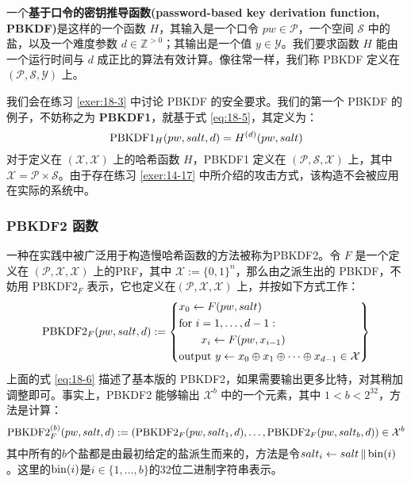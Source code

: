 \begin{definition}
	一个\textbf{基于口令的密钥推导函数(password-based key derivation function, PBKDF)}是这样的一个函数 $H$，其输入是一个口令 $pw\in\mathcal{P}$，一个空间 $\mathcal{S}$ 中的盐，以及一个难度参数 $d\in\mathbb{Z}^{>0}$；其输出是一个值 $y\in\mathcal{Y}$。我们要求函数 $H$ 能由一个运行时间与 $d$ 成正比的算法有效计算。像往常一样，我们称 PBKDF 定义在 $(\mathcal{P},\mathcal{S},\mathcal{Y})$ 上。
\end{definition}

我们会在练习 \ref{exer:18-3} 中讨论 PBKDF 的安全要求。我们的第一个 PBKDF 的例子，不妨称之为 \textbf{PBKDF1}，就基于式 \ref{eq:18-5}，其定义为：
\[
{\rm PBKDF1}_H(pw,salt,d)=H^{(d)}(pw,salt)
\]
对于定义在 $(\mathcal{X},\mathcal{X})$ 上的哈希函数 $H$，PBKDF1 定义在 $(\mathcal{P},\mathcal{S},\mathcal{X})$ 上，其中 $\mathcal{X}=\mathcal{P}\times\mathcal{S}$。由于存在练习 \ref{exer:14-17} 中所介绍的攻击方式，该构造不会被应用在实际的系统中。

\subsubsection{PBKDF2 函数}

一种在实践中被广泛用于构造慢哈希函数的方法被称为PBKDF2。令 $F$ 是一个定义在 $(\mathcal{P},\mathcal{X},\mathcal{X})$ 上的PRF，其中 $\mathcal{X}:=\{0,1\}^n$，那么由之派生出的 PBKDF，不妨用 $\text{PBKDF2}_F$ 表示，它也定义在$(\mathcal{P},\mathcal{X},\mathcal{X})$ 上，并按如下方式工作：
\begin{equation}\label{eq:18-6}
	{\rm PBKDF2}_F(pw,salt,d):=
	\left\{
	\begin{aligned}
		& x_0\leftarrow F(pw, salt)\\
		& \text{for }i=1,\dots,d-1:\\
		& \quad\quad x_i\leftarrow F(pw,x_{i-1})\\
		& \text{output }y\leftarrow x_0 \oplus x_1 \oplus \cdots \oplus x_{d-1}\in\mathcal{X}
	\end{aligned}
	\right\}
\end{equation}
上面的式 \ref{eq:18-6} 描述了基本版的 PBKDF2，如果需要输出更多比特，对其稍加调整即可。事实上，PBKDF2 能够输出 $\mathcal{X}^b$ 中的一个元素，其中 $1<b<2^{32}$，方法是计算：
\begin{equation}\label{eq:18-7}
{\rm PBKDF2}_F^{(b)}(pw,salt,d):=
\left(
{\rm PBKDF2}_F(pw,salt_1,d),\dots,
{\rm PBKDF2}_F(pw,salt_b,d)
\right)
\in\mathcal{X}^b
\end{equation}
其中所有的$b$个盐都是由最初给定的盐派生而来的，方法是令$salt_i\leftarrow salt\,\Vert\,{\rm bin}(i)$。这里的${\rm bin}(i)$是$i\in\{1,\dots,b\}$的32位二进制字符串表示。

